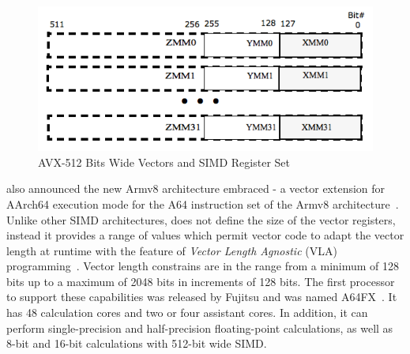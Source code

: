 \documentclass[conference]{IEEEtran}
\begin{document}
\begin{figure}[h]
    \centering
    \includegraphics[width=\linewidth]{avx_mms.png}
    \caption{AVX-512 Bits Wide Vectors and SIMD Register Set}
    \label{fig:avx_mms}
\end{figure}

\arm also announced the new Armv8 architecture embraced \sve - a vector extension for AArch64
execution mode for the A64 instruction set of the
Armv8 architecture~\cite{arm-v8-ref, ARMv8-Architecture}.
Unlike other SIMD architectures, \sve does not define the size of the vector
registers, instead it provides a range of values which permit vector code to
adapt the vector length at runtime with the feature of \emph{Vector Length
Agnostic} (VLA) programming~\cite{Advanced-SIMD,vla-stencil}. Vector length
constrains are in the range from a minimum of 128 bits up to a maximum of 2048
bits in increments of 128 bits. The first processor to support these
capabilities was released by Fujitsu and was named A64FX~\cite{fujitsugit}. It
has 48 calculation cores and two or four assistant cores. In addition, it can
perform single-precision and half-precision floating-point calculations, as well
as 8-bit and 16-bit calculations with 512-bit wide SIMD.
\end{document}
